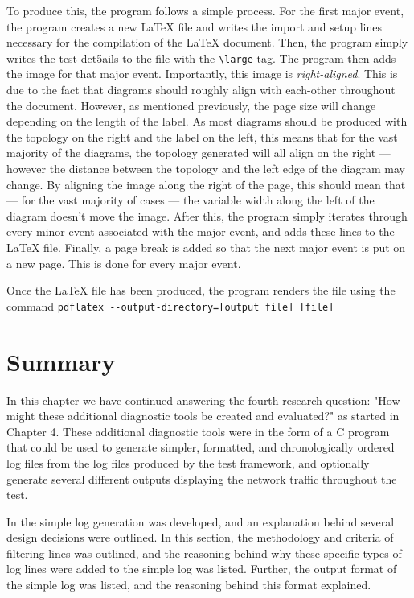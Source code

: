 To produce this, the program follows a simple process.
For the first major event, the program creates a new LaTeX file and writes the import and setup lines necessary for the compilation of the LaTeX document.
Then, the program simply writes the test det5ails to the file with the \verb|\large| tag.
The program then adds the image for that major event. Importantly, this image is \emph{right-aligned}. 
This is due to the fact that diagrams should roughly align with each-other throughout the document.
However, as mentioned previously, the page size will change depending on the length of the label.
As most diagrams should be produced with the topology on the right and the label on the left, this means that for the vast majority of the diagrams, the topology generated will all align on the right — however the distance between the topology and the left edge of the diagram may change.
By aligning the image along the right of the page, this should mean that — for the vast majority of cases — the variable width along the left of the diagram doesn't move the image.
After this, the program simply iterates through every minor event associated with the major event, and adds these lines to the LaTeX file.
Finally, a page break is added so that the next major event is put on a new page.
This is done for every major event.

Once the LaTeX file has been produced, the program renders the file using the command
\verb|pdflatex --output-directory=[output file] [file]|


\section{Summary}

In this chapter we have continued answering the fourth research question: "How might these additional diagnostic tools be created and evaluated?" as started in Chapter 4.
These additional diagnostic tools were in the form of a C program that could be used to generate simpler, formatted, and chronologically ordered log files from the log files produced by the test framework, and optionally generate several different outputs displaying the network traffic throughout the test.

In  the simple log generation was developed, and an explanation behind several design decisions were outlined.
In this section, the methodology and criteria of filtering lines was outlined, and the reasoning behind why these specific types of log lines were added to the simple log was listed.
Further, the output format of the simple log was listed, and the reasoning behind this format explained.

